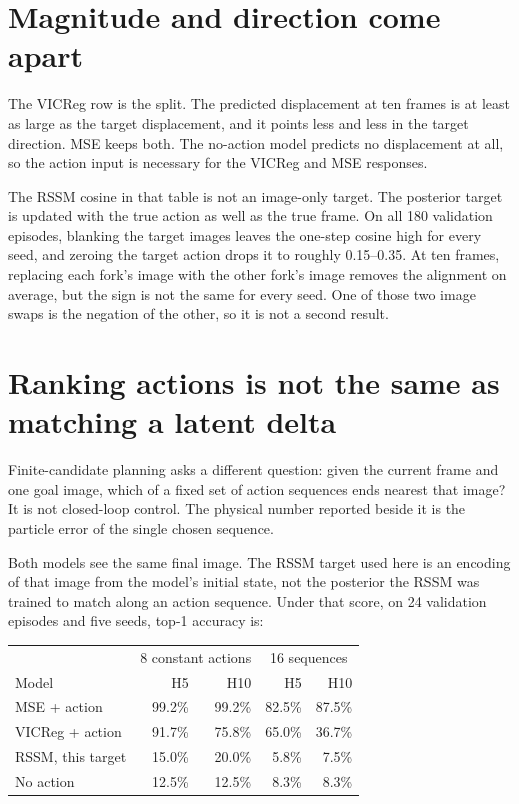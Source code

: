 \documentclass{article}
\begin{document}
\section{Magnitude and direction come apart}

The VICReg row is the split. The predicted displacement at ten frames is at least as large as the target displacement, and it points less and less in the target direction. MSE keeps both. The no-action model predicts no displacement at all, so the action input is necessary for the VICReg and MSE responses.

The RSSM cosine in that table is not an image-only target. The posterior target is updated with the true action as well as the true frame. On all 180 validation episodes, blanking the target images leaves the one-step cosine high for every seed, and zeroing the target action drops it to roughly 0.15--0.35. At ten frames, replacing each fork's image with the other fork's image removes the alignment on average, but the sign is not the same for every seed. One of those two image swaps is the negation of the other, so it is not a second result.

\section{Ranking actions is not the same as matching a latent delta}

Finite-candidate planning asks a different question: given the current frame and one goal image, which of a fixed set of action sequences ends nearest that image? It is not closed-loop control. The physical number reported beside it is the particle error of the single chosen sequence.

Both models see the same final image. The RSSM target used here is an encoding of that image from the model's initial state, not the posterior the RSSM was trained to match along an action sequence. Under that score, on 24 validation episodes and five seeds, top-1 accuracy is:

\begin{center}
\begin{tabular}{lrrrr}
\toprule
 & \multicolumn{2}{c}{8 constant actions} & \multicolumn{2}{c}{16 sequences} \\
Model & H5 & H10 & H5 & H10 \\
\midrule
MSE + action & 99.2\% & 99.2\% & 82.5\% & 87.5\% \\
VICReg + action & 91.7\% & 75.8\% & 65.0\% & 36.7\% \\
RSSM, this target & 15.0\% & 20.0\% & 5.8\% & 7.5\% \\
No action & 12.5\% & 12.5\% & 8.3\% & 8.3\% \\
\bottomrule
\end{tabular}
\end{center}
\end{document}
